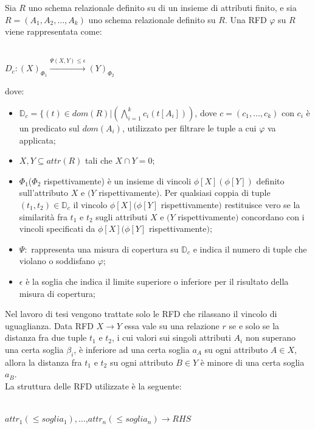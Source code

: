 \begin{theorem}
	Sia $R$ uno schema relazionale definito su di un insieme di attributi finito, e sia $R=(A_1,A_2,...,A_k)$ uno  schema relazionale definito su $R$. Una RFD $\varphi$ su $R$ viene rappresentata come:
	\\ \\
	\centerline{$D_{c}:(X)_{\Phi_1} \xrightarrow{\Psi(X,Y)\leq\epsilon}(Y)_{\Phi_2}$}
	
	
	dove: 
	\begin{itemize}
		\item $\mathbb{D}_{c} = \{(t)\in dom(R)|(\bigwedge_{i=1}^{k} c_{i}(t[A_i]))$, dove $c=(c_{1},...,c_{k}) $ con $c_{i}$ è un predicato sul $dom(A_i)$, utilizzato per filtrare le tuple a cui $\varphi$ va applicata;
		
		\item $X,Y \subseteq attr(R)$  tali che $X\cap Y=0$;
		
		\item $\Phi_1$($\Phi_2$ rispettivamente) è un insieme di vincoli $\phi[X](\phi[Y])$ definito sull'attributo $X$ e $(Y$ rispettivamente$)$. Per qualsiasi coppia di tuple $(t_1,t_2) \in \mathbb{D}_{c}$ il vincolo $\phi[X](\phi[Y]$ rispettivamente$)$ restituisce vero se la similarità fra $t_1$ e $t_2$ sugli attributi $X$ e $(Y$ rispettivamente$)$ concordano con i vincoli specificati da $\phi[X](\phi[Y]$ rispettivamente$)$;
		
		\item $\Psi:$ rappresenta una misura di copertura su $\mathbb{D}_{c}$ e indica il numero di tuple che violano o soddisfano $\varphi$;
		
		\item $\epsilon$ è la soglia che indica il limite superiore o inferiore per il risultato della misura di copertura;
	\end{itemize}
\end{theorem}
Nel lavoro di tesi vengono trattate solo le RFD che rilassano il vincolo di uguaglianza. Data RFD $X \xrightarrow{} Y$ essa vale su una relazione $r$ se e solo se la distanza fra due tuple $t_1$ e $t_2$, i cui valori sui singoli attributi $A_i$ non superano una certa soglia $\beta_i$, è inferiore ad una certa soglia $a_A$ su ogni attributo $A \in X$, allora la distanza fra $t_1$ e $t_2$ su ogni attributo $B \in Y$ è minore di una certa soglia $a_B$.\\
La struttura delle RFD utilizzate è la seguente:
\\~\\
\centerline{$attr_1(\leq soglia_1),\ldots$,$attr_n(\leq soglia_n) \xrightarrow{} RHS$}
